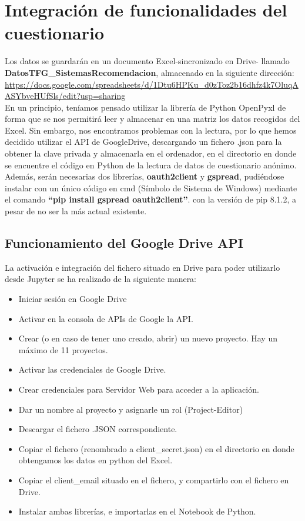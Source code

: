\section{Integración de funcionalidades del cuestionario}
Los datos se guardarán en un documento Excel-sincronizado en Drive-  llamado  \textbf{DatosTFG\_SistemasRecomendacion}, almacenado en la siguiente dirección: \url{https://docs.google.com/spreadsheets/d/1Dtu6HPKu_d0zToz2b16dhfz4k7OluqAASYbveHUfSls/edit?usp=sharing} \\En un principio, teníamos pensado utilizar la librería de Python  OpenPyxl  de forma que se nos permitirá leer y almacenar en una matriz los datos recogidos del Excel. Sin embargo, nos encontramos problemas con la lectura, por lo que hemos decidido utilizar el API de GoogleDrive, descargando un fichero .json para la obtener la clave privada y almacenarla en el ordenador, en el directorio en donde se encuentre el código en Python de la lectura de datos de cuestionario anónimo. \\Además, serán necesarias dos librerías, \textbf{oauth2client} y \textbf{gspread}, pudiéndose instalar con un único código en cmd (Símbolo de Sistema de Windows)  mediante el comando \textbf{``pip install gspread oauth2client''}. \nocite{twilio:api}con la versión de pip 8.1.2, a pesar de no ser la más actual existente. 

\subsection{Funcionamiento del Google Drive API }
La activación e integración del fichero situado en Drive para poder utilizarlo desde Jupyter se ha realizado de la siguiente manera: 
\begin{itemize}
\item Iniciar sesión en Google Drive
\item Activar en la consola de APIs de Google la API. 
\item Crear (o en caso de tener uno creado, abrir) un nuevo proyecto. Hay un máximo de 11 proyectos. 
\item Activar las credenciales de Google Drive. 
\item Crear credenciales para Servidor Web para acceder a la aplicación. 
\item Dar un nombre al proyecto y asignarle un rol (Project-Editor)
\item Descargar el fichero .JSON correspondiente. 
\item Copiar el fichero (renombrado a client\_secret.json) en el directorio en donde obtengamos los datos en python del Excel. 
\item Copiar el client\_email situado en el fichero, y compartirlo con el fichero en Drive.
\item Instalar ambas librerías, e importarlas en el Notebook  de Python. 
\end{itemize}

